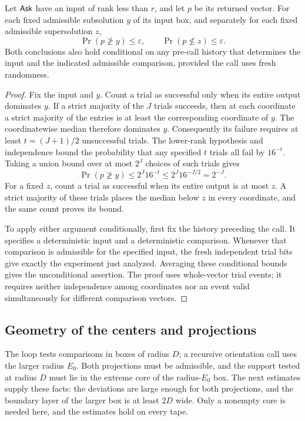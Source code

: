 \begin{lemma}
\label{lem:ask-amplification}
Let \(\mathsf{Ask}\) have an input of rank less than \(r\), and let \(p\) be
its returned vector. For each fixed admissible subsolution \(y\) of its
input box, and separately for each fixed admissible supersolution \(z\),
\[
  \Pr(p\not\geq y)\leq\varepsilon,
  \qquad
  \Pr(p\not\leq z)\leq\varepsilon.
\]
Both conclusions also hold conditional on any pre-call history that
determines the input and the indicated admissible comparison, provided
the call uses fresh randomness.
\end{lemma}

\begin{proof}
Fix the input and \(y\). Count a trial as successful only when its
entire output dominates \(y\). If a strict majority of the \(J\)
trials succeeds, then at each coordinate a strict majority of the
entries is at least the corresponding coordinate of \(y\). The
coordinatewise median therefore dominates \(y\).
Consequently its failure requires at least
\(t=(J+1)/2\) unsuccessful trials. The lower-rank hypothesis and
independence bound the probability that any specified \(t\) trials
all fail by \(16^{-t}\). Taking a union bound over at most \(2^J\)
choices of such trials gives
\[
  \Pr(p\not\geq y)
  \leq 2^J16^{-t}
  \leq 2^J16^{-J/2}
  =2^{-J}.
\]
For a fixed \(z\), count a trial as successful when its entire output
is at most \(z\). A strict majority of these trials places the median
below \(z\) in every coordinate, and the same count proves its bound.

To apply either argument conditionally, first fix the history preceding
the call. It specifies a deterministic input and a deterministic
comparison. Whenever that comparison is admissible for the specified
input, the fresh independent trial bits give exactly the experiment
just analyzed. Averaging these conditional bounds gives the
unconditional assertion. The proof uses whole-vector trial events;
it requires neither independence among coordinates nor an event valid
simultaneously for different comparison vectors.
\end{proof}

\subsection{Geometry of the centers and projections}

The loop tests comparisons in boxes of radius \(D\); a recursive
orientation call uses the larger radius \(E_0\). Both projections
must be admissible, and the support tested at radius \(D\) must lie
in the extreme core of the radius-\(E_0\) box. The next estimates
supply these facts: the deviations are large enough for both projections, and the
boundary layer of the larger box is at least \(2D\) wide. Only a
nonempty core is needed here, and the estimates hold on every tape.

